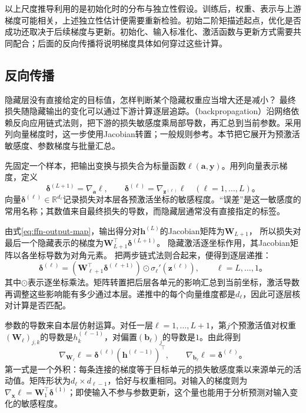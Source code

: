 以上尺度推导利用的是初始化时的分布与独立性假设。训练后，权重、表示与上游梯度可能相关，上述独立性估计便需要重新检验。初始二阶矩描述起点，优化是否成功还取决于后续梯度与更新。初始化、输入标准化、激活函数与更新方式需要共同配合；后面的反向传播将说明梯度具体如何穿过这些计算。

\subsection{反向传播}
\label{sec:ffn-backpropagation}

隐藏层没有直接给定的目标值，怎样判断某个隐藏权重应当增大还是减小？
最终损失随隐藏输出的变化可以通过下游计算逐层追踪。（backpropagation）沿网络依赖反向应用链式法则，把下游的损失敏感度乘局部导数，再汇总到当前参数。采用列向量梯度时，这一步使用Jacobian转置；一般规则参考。本节把它展开为预激活敏感度、参数梯度与批量汇总。

先固定一个样本，把输出变换与损失合为标量函数$\ell(\bm{a},\bm{y})$。用列向量表示梯度，定义
\begin{equation}
  \bm{\delta}^{(L+1)}=\nabla_{\bm{a}}\ell,
  \qquad
  \bm{\delta}^{(\ell)}=\nabla_{\bm{z}^{(\ell)}}\ell
  \quad(\ell=1,\ldots,L)\text{。}
  \label{eq:ffn-delta-definition}
\end{equation}
向量$\bm{\delta}^{(\ell)}\in\mathbb{R}^{d_\ell}$记录损失对本层各预激活坐标的敏感程度。“误差”是这一敏感度的常用名称；其数值来自最终损失的导数，而隐藏层通常没有直接指定的标签。

由式\eqref{eq:ffn-output-map}，输出得分对$\bm{h}^{(L)}$的Jacobian矩阵为$\bm{W}_{L+1}$，
所以损失对最后一个隐藏表示的梯度为$\bm{W}_{L+1}^{\top}\bm{\delta}^{(L+1)}$。
隐藏激活逐坐标作用，其Jacobian矩阵以各坐标导数为对角元素。
把两步链式法则合起来，便得到逐层递推：
\begin{equation}
  \bm{\delta}^{(\ell)}=
  \left(\bm{W}_{\ell+1}^{\top}\bm{\delta}^{(\ell+1)}\right)
  \odot\sigma_\ell'\!\left(\bm{z}^{(\ell)}\right),
  \qquad \ell=L,\ldots,1\text{。}
  \label{eq:ffn-backward-recursion}
\end{equation}
其中$\odot$表示逐坐标乘法。矩阵转置把后层各单元的影响汇总到当前坐标，激活导数再调整这些影响能有多少通过本层。递推中的每个向量维度都是$d_\ell$，因此可逐层核对计算是否匹配。

参数的导数来自本层仿射运算。对任一层$\ell=1,\ldots,L+1$，第$j$个预激活值对权重$(\bm{W}_\ell)_{j,k}$的导数是$h_k^{(\ell-1)}$，对偏置$(\bm{b}_\ell)_j$的导数是$1$。由此得到
\begin{equation}
  \nabla_{\bm{W}_\ell}\ell
    =\bm{\delta}^{(\ell)}(\bm{h}^{(\ell-1)})^{\top},
  \qquad
  \nabla_{\bm{b}_\ell}\ell=\bm{\delta}^{(\ell)}\text{。}
  \label{eq:ffn-parameter-gradients}
\end{equation}
第一式是一个外积：每条连接的梯度等于目标单元的损失敏感度乘以来源单元的活动值。矩阵形状为$d_\ell\times d_{\ell-1}$，恰好与权重相同。对输入的梯度则为$\nabla_{\bm{x}}\ell=\bm{W}_1^{\top}\bm{\delta}^{(1)}$；即使输入不参与参数更新，这个量也能用于分析预测对输入变化的敏感程度。

